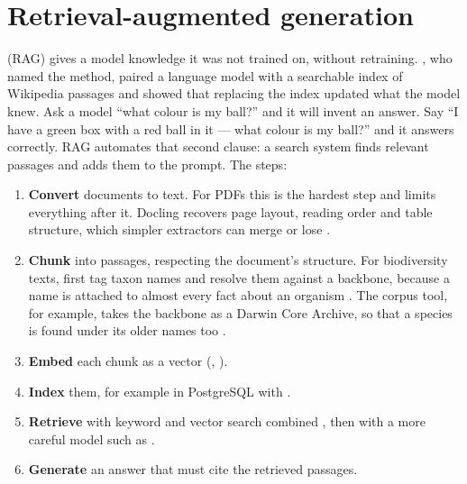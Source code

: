 \section{Retrieval-augmented generation}

 (RAG) gives a model knowledge it was not
trained on, without retraining. \textcite{lewis2020rag}, who named the method,
paired a language model with a searchable index of Wikipedia passages and
showed that replacing the index updated what the model knew. Ask a
model ``what colour is my ball?'' and it will invent an answer. Say ``I have a
green box with a red ball in it --- what colour is my ball?'' and it answers
correctly. RAG automates that second clause: a search system finds relevant
passages and adds them to the prompt. The steps:

\begin{enumerate}
  \item \textbf{Convert} documents to text. For PDFs this is the hardest step
    and limits everything after it. Docling recovers page layout, reading order
    and table structure, which simpler extractors can merge or lose
    \parencite{auer2024docling}.
  \item \textbf{Chunk} into passages, respecting the document's structure. For
    biodiversity texts, first tag taxon names and resolve them against a
    backbone, because a name is attached to almost every fact about an organism
    \parencite{thessen2012nlp}. The corpus tool, for example, takes the backbone as a
    Darwin Core Archive, so that a species is found under its older names too
    \parencite{church2026corpus}.
  \item \textbf{Embed} each chunk as a vector (, ).
  \item \textbf{Index} them, for example in PostgreSQL with .
  \item \textbf{Retrieve} with keyword and vector search combined
    \parencite{iyer2025conservationevidence}, then
     with a more careful model such as .
  \item \textbf{Generate} an answer that must cite the retrieved passages.
\end{enumerate}

